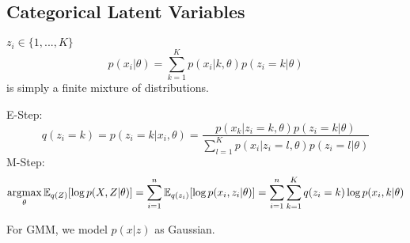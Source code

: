 \subsection{Categorical Latent Variables}
$z_i \in \{1,...,K\}$
$$p(x_i|\theta) = \sum_{k=1}^{K}p(x_i|k,\theta)p(z_i=k|\theta)$$
is simply a finite mixture of distributions. 

E-Step:
$$q(z_i=k) = p(z_i=k|x_i,\theta) = \frac{p(x_k|z_i=k,\theta)p(z_i=k|\theta)}{\sum_{l=1}^{K}p(x_i|z_i=l,\theta)p(z_i=l|\theta)}$$
M-Step:
$$\operatorname*{\operatorname{argmax}}_{\theta}\mathbb{E}_{q(Z)}[\log p(X,Z|\theta)] = \sum_{i=1}^{n}\mathbb{E}_{q(z_i)}[\log p(x_i,z_i|\theta)] = \sum_{i=1}^{n}\sum_{k=1}^{K}q(z_i=k)\log p(x_i,k|\theta)$$

For GMM, we model $p(x|z)$ as Gaussian.

%
